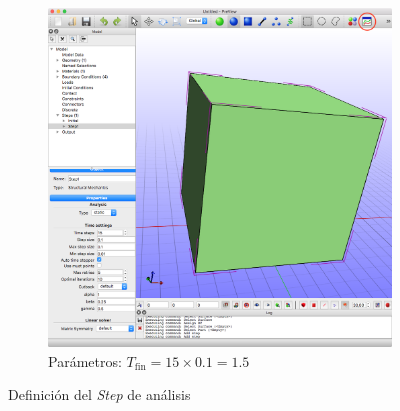 \begin{figure}[!htp]
\begin{subfigure}[b]{0.48\textwidth}
\includegraphics[width=\textwidth]{figuras_3/scr-pre-13m.png}
\caption{Parámetros: $T_\text{fin}=15\times 0.1=1.5$}
\label{fig:pre-13}
\end{subfigure}
\caption{Definición del \emph{Step} de análisis}
\label{fig:pre-12-13}
\end{figure}

